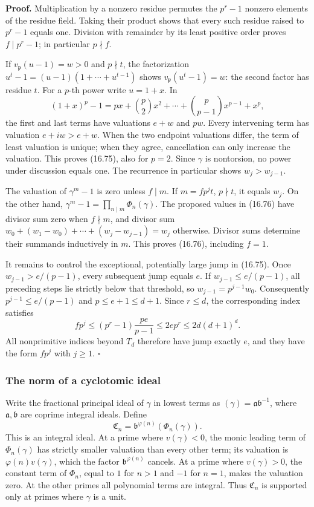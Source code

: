 \documentclass[
  11pt,
  a4paper,
]{article}
\begin{document}
\textbf{Proof.} Multiplication by a nonzero residue permutes the
\(p^r-1\) nonzero elements of the residue field. Taking their product
shows that every such residue raised to \(p^r-1\) equals one. Division
with remainder by its least positive order proves \(f\mid p^r-1\); in
particular \(p\nmid f\).

If \(v_{\mathfrak p}(u-1)=w>0\) and \(p\nmid t\), the factorization
\(u^t-1=(u-1)(1+\cdots+u^{t-1})\) shows \(v_{\mathfrak p}(u^t-1)=w\):
the second factor has residue \(t\). For a \(p\)-th power write
\(u=1+x\). In \[
 (1+x)^p-1=px+\binom p2x^2+\cdots+\binom p{p-1}x^{p-1}+x^p,
\] the first and last terms have valuations \(e+w\) and \(pw\). Every
intervening term has valuation \(e+iw>e+w\). When the two endpoint
valuations differ, the term of least valuation is unique; when they
agree, cancellation can only increase the valuation. This proves
(16.75), also for \(p=2\). Since \(\gamma\) is nontorsion, no power
under discussion equals one. The recurrence in particular shows
\(w_j>w_{j-1}\).

The valuation of \(\gamma^m-1\) is zero unless \(f\mid m\). If
\(m=fp^jt\), \(p\nmid t\), it equals \(w_j\). On the other hand,
\(\gamma^m-1=\prod_{n\mid m}\Phi_n(\gamma)\). The proposed values in
(16.76) have divisor sum zero when \(f\nmid m\), and divisor sum
\(w_0+(w_1-w_0)+\cdots+(w_j-w_{j-1})=w_j\) otherwise. Divisor sums
determine their summands inductively in \(m\). This proves (16.76),
including \(f=1\).

It remains to control the exceptional, potentially large jump in
(16.75). Once \(w_{j-1}>e/(p-1)\), every subsequent jump equals \(e\).
If \(w_{j-1}\le e/(p-1)\), all preceding steps lie strictly below that
threshold, so \(w_{j-1}=p^{j-1}w_0\). Consequently
\(p^{j-1}\le e/(p-1)\) and \(p\le e+1\le d+1\). Since \(r\le d\), the
corresponding index satisfies \[
 fp^j\le(p^r-1)\frac{pe}{p-1}
 \le2ep^r\le2d(d+1)^d.
\] All nonprimitive indices beyond \(T_d\) therefore have jump exactly
\(e\), and they have the form \(fp^j\) with \(j\ge1\). \(\square\)

\subsubsection{The norm of a cyclotomic
ideal}\label{the-norm-of-a-cyclotomic-ideal}

Write the fractional principal ideal of \(\gamma\) in lowest terms as
\((\gamma)=\mathfrak a\mathfrak b^{-1}\), where
\(\mathfrak a,\mathfrak b\) are coprime integral ideals. Define \[
 \mathfrak C_n=\mathfrak b^{\varphi(n)}(\Phi_n(\gamma)).
 \tag{16.78}
\] This is an integral ideal. At a prime where \(v(\gamma)<0\), the
monic leading term of \(\Phi_n(\gamma)\) has strictly smaller valuation
than every other term; its valuation is \(\varphi(n)v(\gamma)\), which
the factor \(\mathfrak b^{\varphi(n)}\) cancels. At a prime where
\(v(\gamma)>0\), the constant term of \(\Phi_n\), equal to \(1\) for
\(n>1\) and \(-1\) for \(n=1\), makes the valuation zero. At the other
primes all polynomial terms are integral. Thus \(\mathfrak C_n\) is
supported only at primes where \(\gamma\) is a unit.
\end{document}
